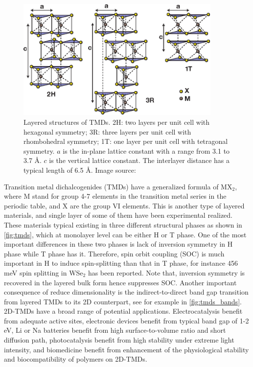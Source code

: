 \begin{figure}[htbp!] 
\centering  
\includegraphics[width=0.9\textwidth]{tmds.eps}
\caption[Layered structures of TMDs]{Layered structures of TMDs. 2H: two layers per unit cell with hexagonal symmetry; 3R: three layers per unit cell with rhombohedral symmetry; 1T: one layer per unit cell with tetragonal symmetry. $a$ is the in-plane lattice constant with a range from 3.1 to 3.7 \AA. $c$ is the vertical lattice constant. The interlayer distance has a typical length of 6.5 \AA. Image source: \cite{Wang2012}}  
\label{fig:tmds}
\end{figure} 

Transition metal dichalcogenides (TMDs) have a generalized formula of MX$_2$, where M stand for group 4-7 elements in the transition metal series in the periodic table, and X are the group VI elements. This is another type of layered materials, and single layer of some of them have been experimental realized.  These materials typical existing in three different structural phases as shown in \autoref{fig:tmds}, which at monolayer level can be either H or T phase. One of the most important differences in these two phases is lack of inversion symmetry in H phase while T phase has it. Therefore, spin orbit coupling (SOC) is much important in H to induce spin-splitting than that in T phase, for instance 456 meV spin splitting in WSe$_2$\cite{Zhu2011giant} has been reported. Note that, inversion symmetry is recovered in the layered bulk form hence suppresses SOC. Another important consequence of reduce dimensionality is the indirect-to-direct band gap transition from layered TMDs to its 2D counterpart, see for example in \autoref{fig:tmds_bands}. 2D-TMDs have a broad range of potential applications. Electrocatalysis\cite{kim2013enhanced,huang2014synthesis} benefit from adequate active sites, electronic devices\cite{RadisavljevicB2011,sun2014fabrication} benefit from typical band gap of 1-2 eV, Li or Na batteries\cite{chang2011cysteine,chen2013situ} benefit from high surface-to-volume ratio and short diffusion path, photocatalysis benefit from high stability under extreme light intensity\cite{Li2013,Parzinger2015}, and biomedicine benefit from enhancement of the physiological stability and biocompatibility of polymers on 2D-TMDs\cite{Cheng2014,Yin2014}. 



